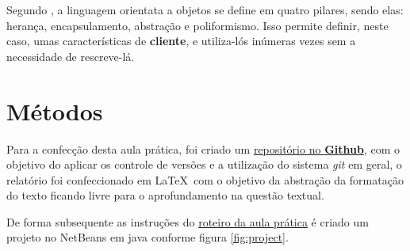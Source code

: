 \par Segundo , a linguagem orientata a objetos se define em quatro pilares, sendo elas: herança, encapsulamento, abstração e poliformismo. Isso permite definir, neste caso, umas características de \textbf{cliente}, e utiliza-lós inúmeras vezes sem a necessidade de rescreve-lá.

\section{Métodos}
\par Para a confecção desta aula prática, foi criado um \href{https://github.com/OgliariNatan/gerenciaBanco}{repositório no \textbf{Github}}, com o objetivo do aplicar os controle de versões e a utilização do sistema \textit{git} em geral, o relatório foi confeccionado em \LaTeX\, com o objetivo da abstração da formatação do texto ficando livre para o aprofundamento na questão textual.


\par De forma subsequente as instruções do \href{https://github.com/OgliariNatan/gerenciaBanco/blob/main/Aula%20pr%C3%A1tica.pdf}{roteiro da aula prática} é criado um projeto no NetBeans em java conforme figura \ref{fig:project}.

